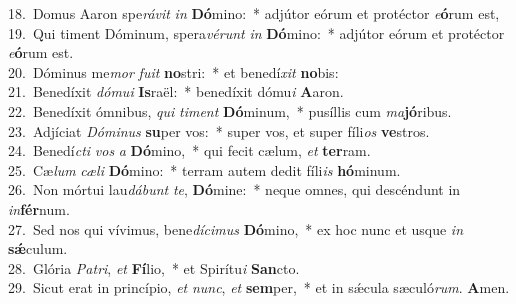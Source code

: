 {18.~}Domus Aaron spe\textit{rá}\textit{vit} \textit{in} \textbf{Dó}mino:~* adjútor eórum et protéctor \textit{e}\textbf{ó}rum est,\\
{19.~}Qui timent Dóminum, spera\textit{vé}\textit{runt} \textit{in} \textbf{Dó}mino:~* adjútor eórum et protéctor \textit{e}\textbf{ó}rum est.\\
{20.~}Dóminus me\textit{mor} \textit{fu}\textit{it} \textbf{no}stri:~* et benedí\textit{xit} \textbf{no}bis:\\
{21.~}Benedíxit \textit{dó}\textit{mu}\textit{i} \textbf{Is}raël:~* benedíxit dómu\textit{i} \textbf{A}aron.\\
{22.~}Benedíxit ómnibus, \textit{qui} \textit{ti}\textit{ment} \textbf{Dó}minum,~* pusíllis cum \textit{ma}\textbf{jó}ribus.\\
{23.~}Adjíciat \textit{Dó}\textit{mi}\textit{nus} \textbf{su}per vos:~* super vos, et super fíli\textit{os} \textbf{ve}stros.\\
{24.~}Benedí\textit{cti} \textit{vos} \textit{a} \textbf{Dó}mino,~* qui fecit cælum, \textit{et} \textbf{ter}ram.\\
{25.~}Cæ\textit{lum} \textit{cæ}\textit{li} \textbf{Dó}mino:~* terram autem dedit fíli\textit{is} \textbf{hó}minum.\\
{26.~}Non mórtui lau\textit{dá}\textit{bunt} \textit{te}, \textbf{Dó}mine:~* neque omnes, qui descéndunt in \textit{in}\textbf{fér}num.\\
{27.~}Sed nos qui vívimus, bene\textit{dí}\textit{ci}\textit{mus} \textbf{Dó}mino,~* ex hoc nunc et usque \textit{in} \textbf{sǽ}culum.\\
{28.~}Glória \textit{Pa}\textit{tri}, \textit{et} \textbf{Fí}lio,~* et Spirítu\textit{i} \textbf{San}cto.\\
{29.~}Sicut erat in princípio, \textit{et} \textit{nunc}, \textit{et} \textbf{sem}per,~* et in sǽcula sæculó\textit{rum}. \textbf{A}men.\\
